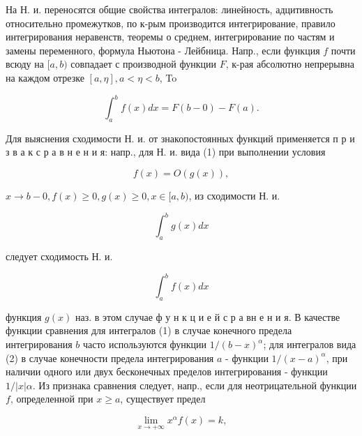 \documentclass[10pt]{article}
\begin{document}
На Н. и. переносятся общие свойства интегралов: линейность, адцитивность относительно промежутков, по к-рым производится интегрирование, правило интегрирования неравенств, теоремы о среднем, интегрирование по частям и замены переменного, формула Ньютона - Лейбница. Напр., если функция $f$ почти всюду на $[a, b)$ совпадает с производной функции $F$, к-рая абсолютно непрерывна на каждом отрезке $[a, \eta], a<\eta<b$, To



\[

\int_{a}^{b} f(x) d x=F(b-0)-F(a) .

\]



Для выяснения сходимости Н. и. от знакопостоянных функций применяется п р и з в а к с р а в н е н и я: напр., для Н. и. вида (1) при выполнении условия



\[

f(x)=O(g(x)),

\]



$x \rightarrow b-0, f(x) \geqslant 0, g(x) \geqslant 0, x \in[a, b)$, из сходимости Н. и.



\[

\int_{a}^{b} g(x) d x

\]



следует сходимость Н. и.



\[

\int_{a}^{b} f(x) d x

\]



функция $g(x)$ наз. в этом случае ф у н к ц и е й с р а вн е н и я. В качестве функции сравнения для интегралов (1) в случае конечного предела интегрирования $b$ часто используются функции $1 /(b-x)^{\alpha}$; для интегралов вида (2) в случае конечности предела интегрирования $a$ - функции $1 /(x-a)^{\alpha}$, при наличии одного или двух бесконечных пределов интегрирования - функции $1 /|x| \alpha$. Из признака сравнения следует, напр., если для неотрицательной функции $f$, определенной при $x \geqslant a$, существует предел



\[

\lim _{x \rightarrow+\infty} x^{\alpha} f(x)=k,

\]
\end{document}
